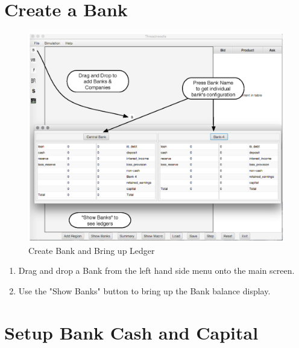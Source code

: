 \documentclass{article}
\begin{document}

\section{Create a Bank}
\begin{figure}[h]
\begin{center}
\includegraphics[width=12cm]{lab_fig_1.eps} 
\caption{Create Bank and Bring up Ledger}
\end{center}
\end{figure}

\begin{enumerate}
\item Drag and drop a Bank from the left hand side menu onto the main screen.
\item Use the "Show Banks" button to bring up the Bank balance display.
\end{enumerate}

\section{Setup Bank Cash and Capital}
\end{document}
